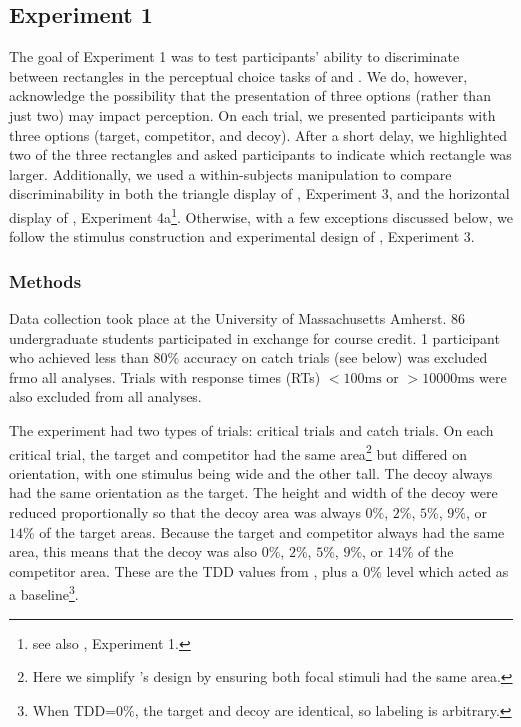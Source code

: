 \documentclass{umassthesis}          %
\begin{document}
\subsection{Experiment 1}
The goal of Experiment 1 was to test participants' ability to discriminate between rectangles in the perceptual choice tasks of \textcite{trueblood2013not} and \textcite{spektorWhenGoodLooks2018b}. We do, however, acknowledge the possibility that the presentation of three options (rather than just two) may impact perception. 
On each trial, we presented participants with three options (target, competitor, and decoy). After a short delay, we highlighted two of the three rectangles and asked participants to indicate which rectangle was larger. 
Additionally, we used a within-subjects manipulation to compare discriminability in both the triangle display of \textcite{spektorWhenGoodLooks2018b}, Experiment 3, and the horizontal display of \textcite{spektorWhenGoodLooks2018b}, Experiment 4a\footnote{see also \textcite{trueblood2013not}, Experiment 1.}. Otherwise, with a few exceptions discussed below, we follow the stimulus construction and experimental design of \textcite{spektorWhenGoodLooks2018b}, Experiment 3. 

\subsubsection{Methods}

Data collection took place at the University of Massachusetts Amherst. 86 undergraduate students participated in exchange for course credit. 1 participant who achieved less than $80\%$ accuracy on catch trials (see below) was excluded frmo all analyses. Trials with response times (RTs) $<100\text{ms}$ or  $>10000\text{ms}$ were also excluded from all analyses.

The experiment had two types of trials: critical trials and catch trials. 
On each critical trial, the target and competitor had the same area\footnote{Here we simplify \textcite{spektorWhenGoodLooks2018b}'s design by ensuring both focal stimuli had the same area.} but differed on orientation, with one stimulus being wide and the other tall. The decoy always had the same orientation as the target. The height and width of the decoy were reduced proportionally so that the decoy area was always $0\%$, $2\%$, $5\%$, $9\%$, or $14\%$ of the target areas. Because the target and competitor always had the same area, this means that the decoy was also $0\%$, $2\%$, $5\%$, $9\%$, or $14\%$ of the competitor area. These are the TDD values from \textcite{spektorWhenGoodLooks2018b}, plus a $0\%$ level which acted as a baseline\footnote{When TDD=$0\%$, the target and decoy are identical, so labeling is arbitrary.}.
\end{document}
